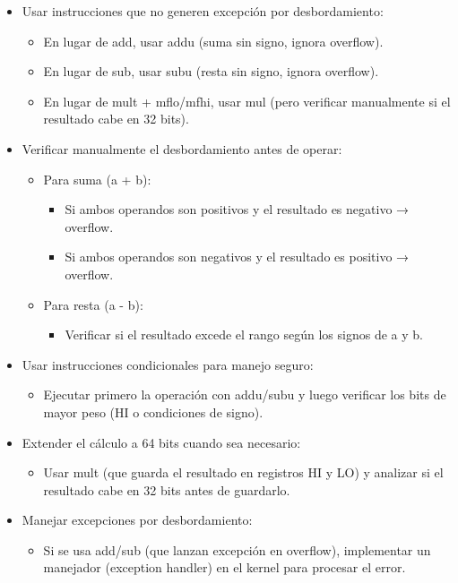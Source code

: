 \documentclass{article}
\begin{document}
\begin{itemize}[leftmargin=*]
    \item Usar instrucciones que no generen excepción por desbordamiento:
    \begin{itemize}
        \item En lugar de add, usar addu (suma sin signo, ignora overflow).
        \item En lugar de sub, usar subu (resta sin signo, ignora overflow).
        \item En lugar de mult + mflo/mfhi, usar mul (pero verificar manualmente si el resultado cabe en 32 bits).
    \end{itemize}
    
    \item Verificar manualmente el desbordamiento antes de operar:
    \begin{itemize}
        \item Para suma (a + b):
        \begin{itemize}
            \item Si ambos operandos son positivos y el resultado es negativo → overflow.
            \item Si ambos operandos son negativos y el resultado es positivo → overflow.
        \end{itemize}
        \item Para resta (a - b):
        \begin{itemize}
            \item Verificar si el resultado excede el rango según los signos de a y b.
        \end{itemize}
    \end{itemize}
    
    \item Usar instrucciones condicionales para manejo seguro:
    \begin{itemize}
        \item Ejecutar primero la operación con addu/subu y luego verificar los bits de mayor peso (HI o condiciones de signo).
    \end{itemize}
    
    \item Extender el cálculo a 64 bits cuando sea necesario:
    \begin{itemize}
        \item Usar mult (que guarda el resultado en registros HI y LO) y analizar si el resultado cabe en 32 bits antes de guardarlo.
    \end{itemize}
    
    \item Manejar excepciones por desbordamiento:
    \begin{itemize}
        \item Si se usa add/sub (que lanzan excepción en overflow), implementar un manejador (exception handler) en el kernel para procesar el error.
    \end{itemize}
\end{itemize}
\end{document}
